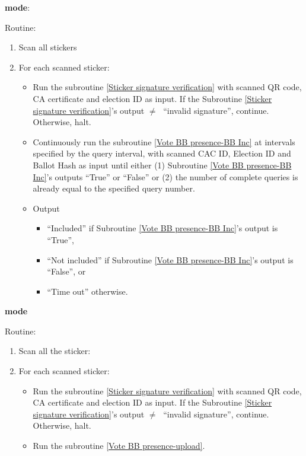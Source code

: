 \documentclass{article}
\begin{document}
\textbf{\BBInclusionCheck{} mode}:


Routine:
\begin{enumerate}
    \item Scan all stickers
    \item For each scanned sticker:
    \begin{itemize}
        \item Run the subroutine \ref{Sticker signature verification} with scanned QR code, CA certificate and election ID as input. If the Subroutine \ref{Sticker signature verification}'s output $\neq\;$ ``invalid signature'', continue. Otherwise, halt.
    \item Continuously run the subroutine \ref{Vote BB presence-BB Inc} at intervals specified by the query interval, with scanned CAC ID, Election ID and Ballot Hash as input until either (1) Subroutine \ref{Vote BB presence-BB Inc}'s outputs ``True'' or ``False'' or (2) the number of complete queries is already equal to the specified query number. 
    \item Output 
    \begin{itemize}
        \item ``Included'' if Subroutine \ref{Vote BB presence-BB Inc}'s output is ``True'',
        \item ``Not included'' if Subroutine \ref{Vote BB presence-BB Inc}'s output is ``False'', or
        \item ``Time out'' otherwise.
    \end{itemize}
    \end{itemize}
\end{enumerate}

\textbf{\StickerBBUpload{}{} mode}

Routine:
\begin{enumerate}
    \item Scan all the sticker:
    \item For each scanned sticker:
    \begin{itemize}

        \item Run the subroutine \ref{Sticker signature verification} with scanned QR code, CA certificate and election ID as input. If the Subroutine \ref{Sticker signature verification}'s output $\neq\;$ ``invalid signature'', continue. Otherwise, halt.
        \item Run the subroutine \ref{Vote BB presence-upload}.
    \end{itemize}
\end{enumerate}
\end{document}
